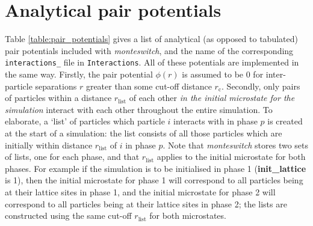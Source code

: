 \documentclass{report}
\begin{document}
\section{Analytical pair potentials}\label{section:pair_potentials}
Table \ref{table:pair_potentials} gives a list of analytical (as opposed to tabulated) 
pair potentials included with \emph{monteswitch}, and the name of the corresponding
\texttt{interactions\_} file in \texttt{Interactions}. All of these potentials are implemented in the same way.
Firstly, the pair potential $\phi(r)$ is assumed to be 0 for inter-particle separations $r$ greater than some cut-off distance $r_{\text{c}}$.
Secondly, only pairs of particles within a distance $r_{\text{list}}$ of each other \emph{in the initial microstate for the simulation} interact
with each other throughout the entire simulation. To elaborate, a `list' of particles which particle $i$ interacts with in phase $p$ is created at 
the start of a simulation: the list consists of all those particles which are initially within distance $r_{\text{list}}$ of $i$ in phase $p$. Note that
\emph{monteswitch} stores two sets of lists, one for each phase, and that $r_{\text{list}}$ applies to the initial microstate for both phases. For
example if the simulation is to be initialised in phase 1 (\textbf{init\_lattice} is 1), then the initial microstate for phase 1 will correspond to
all particles being at their lattice sites in phase 1, and the initial microstate for phase 2 will correspond to all particles being at their lattice 
sites in phase 2; the lists are constructed using the same cut-off $r_{\text{list}}$ for both microstates.
\end{document}
